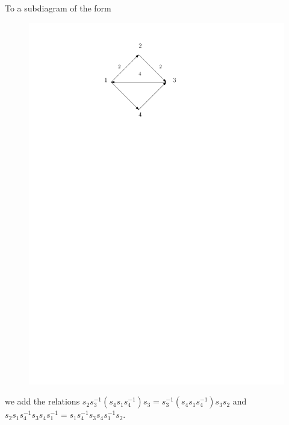 \documentclass{beamer}
\begin{document}
\begin{frame}
To a subdiagram of the form
\begin{figure}
\includegraphics[scale = .50]{Diagram3.pdf}
\end{figure}
we add the relations $s_{2}s_{3}^{-1}(s_{4}s_{1}s_{4}^{-1})s_{3} = s_{3}^{-1}(s_{4}s_{1}s_{4}^{-1})s_{3}s_{2}$ and \\
$s_{2}s_{1}s_{4}^{-1}s_{3}s_{4}s_{1}^{-1} = s_{1}s_{4}^{-1}s_{3}s_{4}s_{1}^{-1}s_{2}$.
\end{frame}
\end{document}
